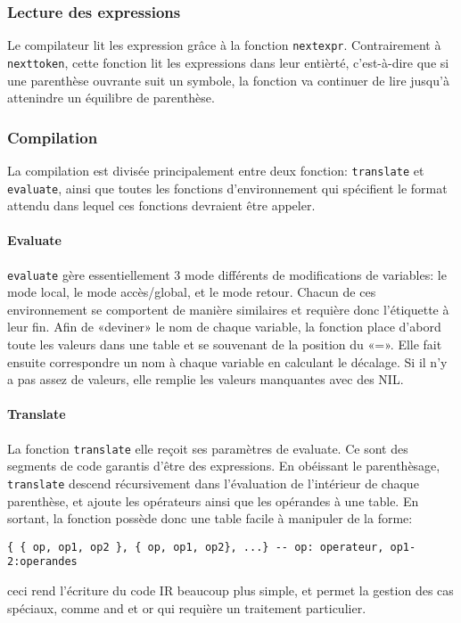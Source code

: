 \documentclass{article}
\begin{document}
\subsubsection{Lecture des expressions}
Le compilateur lit les expression grâce à la fonction \texttt{nextexpr}. Contrairement à \texttt{nexttoken}, cette fonction lit les expressions dans leur entièrté, c'est-à-dire que si une parenthèse ouvrante suit un symbole, la fonction va continuer de lire jusqu'à attenindre un équilibre de parenthèse.

\subsubsection{Compilation}
La compilation est divisée principalement entre deux fonction: \texttt{translate} et \texttt{evaluate}, ainsi que toutes les fonctions d'environnement qui spécifient le format attendu dans lequel ces fonctions devraient être appeler.

\paragraph{Evaluate}
\texttt{evaluate} gère essentiellement 3 mode différents de modifications de variables: le mode local, le mode accès/global, et le mode retour. Chacun de ces environnement se comportent de manière similaires et requière donc l'étiquette à leur fin. Afin de «deviner» le nom de chaque variable, la fonction place d'abord toute les valeurs dans une table et se souvenant de la position du «=». Elle fait ensuite correspondre un nom à chaque variable en calculant le décalage. Si il n'y a pas assez de valeurs, elle remplie les valeurs manquantes avec des NIL.

\paragraph{Translate}
La fonction \texttt{translate} elle reçoit ses paramètres de evaluate. Ce sont des segments de code garantis d'être des expressions. En obéissant le parenthèsage, \texttt{translate} descend récursivement dans l'évaluation de l'intérieur de chaque parenthèse, et ajoute les opérateurs ainsi que les opérandes à une table. En sortant, la fonction possède donc une table facile à manipuler de la forme:
\begin{lstlisting}[belowcaptionskip = -1\baselineskip]
  { { op, op1, op2 }, { op, op1, op2}, ...} -- op: operateur, op1-2:operandes
\end{lstlisting}
ceci rend l'écriture du code IR beaucoup plus simple, et permet la gestion des cas spéciaux, comme and et or qui requière un traitement particulier.
\end{document}
